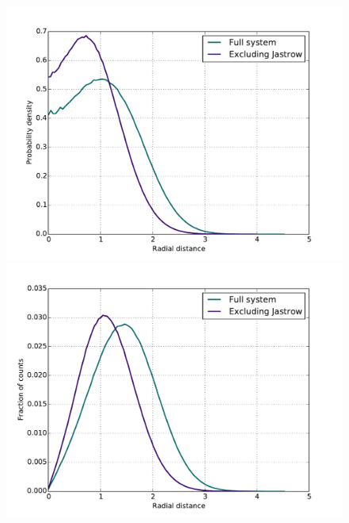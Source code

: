 \documentclass[english, a4paper]{article}
\begin{document}
\begin{figure}
		{\includegraphics[scale=0.43]{figures/radialDistribution/OneBodyDensityN6w100Se7.pdf}}
		{\includegraphics[scale=0.43]{figures/radialDistribution/radialDistributionN6w100Se7.pdf}}
		

\end{figure}
\end{document}
